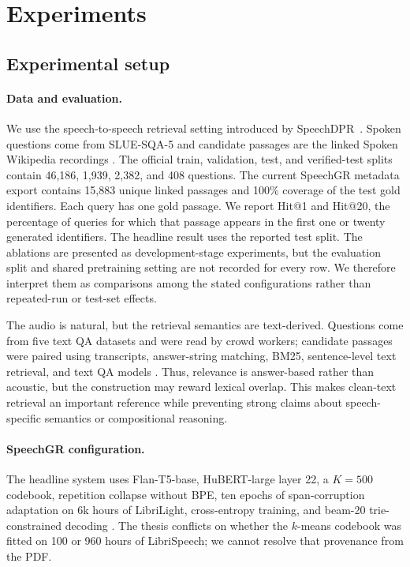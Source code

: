 \section{Experiments}
\label{sec:experiments}

\subsection{Experimental setup}

\paragraph{Data and evaluation.}
We use the speech-to-speech retrieval setting introduced by
SpeechDPR~\citep{Lin2024SpeechDPRES}. Spoken questions come from SLUE-SQA-5
and candidate passages are the linked Spoken Wikipedia recordings
\citep{Shon2022SLUEPA}. The official train, validation, test, and
verified-test splits contain 46,186, 1,939, 2,382, and 408 questions. The
current SpeechGR metadata export contains 15,883 unique linked passages and
100\% coverage of the test gold identifiers. Each query has one gold passage.
We report Hit@1 and Hit@20, the percentage of queries for which that passage
appears in the first one or twenty generated identifiers. The headline result
uses the reported test split. The ablations are presented as development-stage
experiments, but the evaluation split and shared pretraining setting are not
recorded for every row. We therefore interpret them as comparisons among the
stated configurations rather than repeated-run or test-set effects.

The audio is natural, but the retrieval semantics are text-derived. Questions
come from five text QA datasets and were read by crowd workers; candidate
passages were paired using transcripts, answer-string matching, BM25,
sentence-level text retrieval, and text QA models
\citep{Shon2022SLUEPA}. Thus, relevance is answer-based rather than acoustic,
but the construction may reward lexical overlap. This makes clean-text
retrieval an important reference while preventing strong claims about
speech-specific semantics or compositional reasoning.

\paragraph{SpeechGR configuration.}
The headline system uses Flan-T5-base, HuBERT-large layer 22, a \(K=500\)
codebook, repetition collapse without BPE, ten epochs of span-corruption
adaptation on 6k hours of LibriLight, cross-entropy training, and beam-20
trie-constrained decoding
\citep{10.5555/3722577.3722647,Hsu2021HuBERTSS,9052942}.
The thesis conflicts on whether the \(k\)-means codebook was fitted on 100 or
960 hours of LibriSpeech; we cannot resolve that provenance from the PDF.

